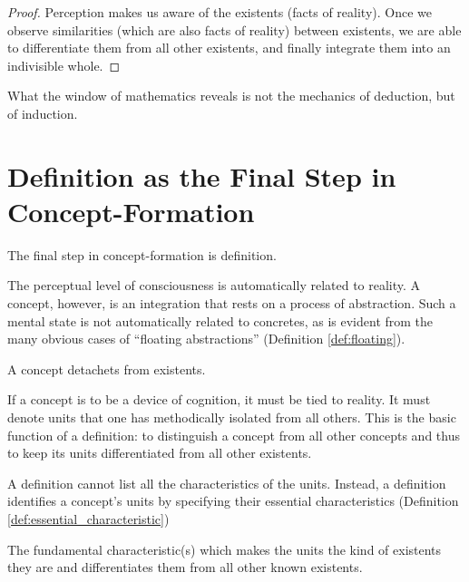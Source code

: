             \begin{proof}
                Perception makes us aware of the existents (facts of reality). Once we observe similarities (which are also facts of reality) between existents, we are able to differentiate them from all other existents, and finally integrate them into an indivisible whole.
            \end{proof}

        What the window of mathematics reveals is not the mechanics of deduction, but of induction. 

    \section{Definition as the Final Step in Concept-Formation}

        The final step in concept-formation is definition.

        The perceptual level of consciousness is automatically related to reality. A concept, however, is an integration that rests on a process of abstraction. Such a mental state is not automatically related to concretes, as is evident from the many obvious cases of ``floating abstractions'' (Definition \ref{def:floating}).

            \begin{definition}
            \label{def:floating}
                A concept detachets from existents.
            \end{definition}

        If a concept is to be a device of cognition, it must be tied to reality. It must denote units that one has methodically isolated from all others. This is the basic function of a definition: to distinguish a concept from all other concepts and thus to keep its units differentiated from all other existents.

        A definition cannot list all the characteristics of the units. Instead, a definition identifies a concept's units by specifying their essential characteristics (Definition \ref{def:essential_characteristic}) 

            \begin{definition}
            \label{def:essential_characteristic}
                The fundamental characteristic(s) which makes the units the kind of existents they are and differentiates them from all other known existents.
            \end{definition}

